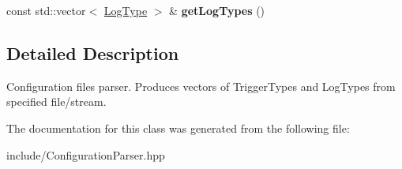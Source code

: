 \begin{DoxyCompactItemize}
\item 
const std\+::vector$<$ \hyperlink{structLogType}{Log\+Type} $>$ \& {\bfseries get\+Log\+Types} ()\hypertarget{classConfigurationParser_a344adb02b8b7d9bb20fd37ece2edc031}{}\label{classConfigurationParser_a344adb02b8b7d9bb20fd37ece2edc031}

\end{DoxyCompactItemize}


\subsection{Detailed Description}
Configuration files parser. Produces vectors of Trigger\+Types and Log\+Types from specified file/stream. 

The documentation for this class was generated from the following file\+:\begin{DoxyCompactItemize}
\item 
include/Configuration\+Parser.\+hpp\end{DoxyCompactItemize}

